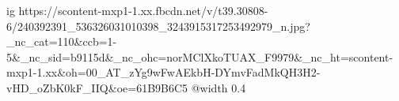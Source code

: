  
 
 
 
 

\ifcmt
  ig https://scontent-mxp1-1.xx.fbcdn.net/v/t39.30808-6/240392391_536326031010398_3243915317253492979_n.jpg?_nc_cat=110&ccb=1-5&_nc_sid=b9115d&_nc_ohc=norMClXkoTUAX_F9979&_nc_ht=scontent-mxp1-1.xx&oh=00_AT_zYg9wFwAEkbH-DYmvFadMkQH3H2-vHD_oZbK0kF_IIQ&oe=61B9B6C5
  @width 0.4
\fi

